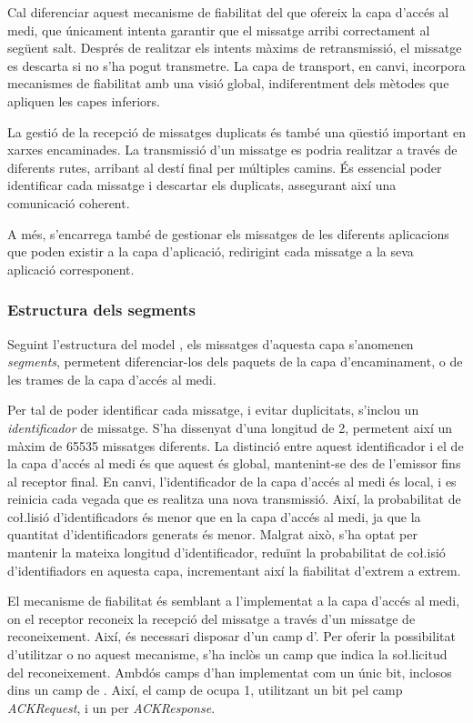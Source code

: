 \documentclass{tfgitic}[2024/07/01]
\begin{document}
{Cal diferenciar aquest mecanisme de fiabilitat del que ofereix la capa d'accés al medi, que únicament intenta garantir que el missatge arribi correctament al següent salt. Després de realitzar els intents màxims de retransmissió, el missatge es descarta si no s'ha pogut transmetre. La capa de transport, en canvi, incorpora mecanismes de fiabilitat amb una visió global, indiferentment dels mètodes que apliquen les capes inferiors.

La gestió de la recepció de missatges duplicats és també una qüestió important en xarxes encaminades. La transmissió d'un missatge es podria realitzar a través de diferents rutes, arribant al destí final per múltiples camins. És essencial poder identificar cada missatge i descartar els duplicats, assegurant així una comunicació coherent. 

A més, s'encarrega també de gestionar els missatges de les diferents aplicacions que poden existir a la capa d'aplicació, redirigint cada missatge a la seva aplicació corresponent.


\subsubsection{Estructura dels segments}
Seguint l'estructura del model , els missatges d'aquesta capa s'anomenen \emph{segments}, permetent diferenciar-los dels paquets de la capa d'encaminament, o de les trames de la capa d'accés al medi. 

Per tal de poder identificar cada missatge, i evitar duplicitats, s'inclou un \emph{identificador} de missatge. S'ha dissenyat d'una longitud de \SI{2}{\byte}, permetent així un màxim de \num{65535} missatges diferents. La distinció entre aquest identificador i el de la capa d'accés al medi és que aquest és global, mantenint-se des de l'emissor fins al receptor final. En canvi, l'identificador de la capa d'accés al medi és local, i es reinicia cada vegada que es realitza una nova transmissió. Així, la probabilitat de co\l.lisió d'identificadors és menor que en la capa d'accés al medi, ja que la quantitat d'identificadors generats és menor. Malgrat això, s'ha optat per mantenir la mateixa longitud d'identificador, reduïnt la probabilitat de co\l.isió d'identifiadors en aquesta capa, incrementant així la fiabilitat d'extrem a extrem. 

El mecanisme de fiabilitat és semblant a l'implementat a la capa d'accés al medi, on el receptor reconeix la recepció del missatge a través d'un missatge de reconeixement. Així, és necessari disposar d'un camp d'. Per oferir la possibilitat d'utilitzar o no aquest mecanisme, s'ha inclòs un camp que indica la so\l.licitud del reconeixement. Ambdós camps d'han implementat com un únic bit, inclosos dins un camp de . Així, el camp de  ocupa \SI{1}{\byte}, utilitzant un bit pel camp \emph{ACKRequest}, i un per \emph{ACKResponse}.

}
\end{document}
